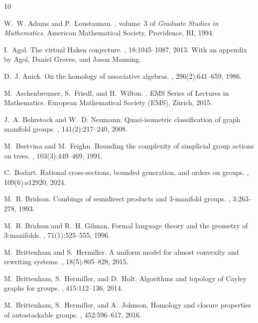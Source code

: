 \documentclass[12pt, a4paper]{amsart}
\theoremstyle{definition}
\begin{document}
\begin{thebibliography}{10}

W.~W. Adams and P.~Loustaunau.
, volume~3 of {\em Graduate
  Studies in Mathematics}.
\newblock American Mathematical Society, Providence, RI, 1994.

I.~Agol.
\newblock The virtual {H}aken conjecture.
, 18:1045--1087, 2013.
\newblock With an appendix by Agol, Daniel Groves, and Jason Manning.

D.~J. Anick.
\newblock On the homology of associative algebras.
, 296(2):641--659, 1986.

M.~Aschenbrenner, S.~Friedl, and H.~Wilton.
.
\newblock EMS Series of Lectures in Mathematics. European Mathematical Society
  (EMS), Z\"{u}rich, 2015.

J.~A. Behrstock and W.~D. Neumann.
\newblock Quasi-isometric classification of graph manifold groups.
, 141(2):217--240, 2008.

M.~Bestvina and M.~Feighn.
\newblock Bounding the complexity of simplicial group actions on trees.
, 103(3):449--469, 1991.

C.~Bodart.
\newblock Rational cross-sections, bounded generation, and orders on groups.
, 109(6):e12920, 2024.

M.~R. Bridson.
\newblock Combings of semidirect products and 3-manifold groups.
, 3:263--278, 1993.

M.~R. Bridson and R.~H. Gilman.
\newblock Formal language theory and the geometry of 3-manifolds.
, 71(1):525--555, 1996.

M.~Brittenham and S.~Hermiller.
\newblock A uniform model for almost convexity and rewriting systems.
, 18(5):805--828, 2015.

M.~Brittenham, S.~Hermiller, and D.~Holt.
\newblock Algorithms and topology of {C}ayley graphs for groups.
, 415:112--136, 2014.

M.~Brittenham, S.~Hermiller, and A.~Johnson.
\newblock Homology and closure properties of autostackable groups.
, 452:596--617, 2016.


\end{thebibliography}
\end{document}
